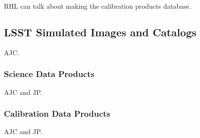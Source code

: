 RHL can talk about making the calibration products database.

\subsection{LSST Simulated Images and Catalogs}

AJC.

\subsubsection{Science Data Products}

AJC and JP.

\subsubsection{Calibration Data Products}

AJC and JP.



